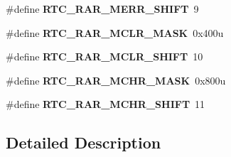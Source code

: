 \begin{DoxyCompactItemize}
\item 
\hypertarget{group___r_t_c___register___masks_gac3fc6d64a067499836ac65efb86a2736}{}\#define {\bfseries R\+T\+C\+\_\+\+R\+A\+R\+\_\+\+M\+E\+R\+R\+\_\+\+S\+H\+I\+F\+T}~9\label{group___r_t_c___register___masks_gac3fc6d64a067499836ac65efb86a2736}

\item 
\hypertarget{group___r_t_c___register___masks_ga2d36fee3a81ff982b6b8a9f4f49df154}{}\#define {\bfseries R\+T\+C\+\_\+\+R\+A\+R\+\_\+\+M\+C\+L\+R\+\_\+\+M\+A\+S\+K}~0x400u\label{group___r_t_c___register___masks_ga2d36fee3a81ff982b6b8a9f4f49df154}

\item 
\hypertarget{group___r_t_c___register___masks_ga83abbb8582f9fa7a41b4f1f9a6d0ab1a}{}\#define {\bfseries R\+T\+C\+\_\+\+R\+A\+R\+\_\+\+M\+C\+L\+R\+\_\+\+S\+H\+I\+F\+T}~10\label{group___r_t_c___register___masks_ga83abbb8582f9fa7a41b4f1f9a6d0ab1a}

\item 
\hypertarget{group___r_t_c___register___masks_gadaa9f937f54bbe876929547e6edc7daa}{}\#define {\bfseries R\+T\+C\+\_\+\+R\+A\+R\+\_\+\+M\+C\+H\+R\+\_\+\+M\+A\+S\+K}~0x800u\label{group___r_t_c___register___masks_gadaa9f937f54bbe876929547e6edc7daa}

\item 
\hypertarget{group___r_t_c___register___masks_ga2917eac6e3a8549d2db891c23ca887ba}{}\#define {\bfseries R\+T\+C\+\_\+\+R\+A\+R\+\_\+\+M\+C\+H\+R\+\_\+\+S\+H\+I\+F\+T}~11\label{group___r_t_c___register___masks_ga2917eac6e3a8549d2db891c23ca887ba}

\end{DoxyCompactItemize}


\subsection{Detailed Description}
